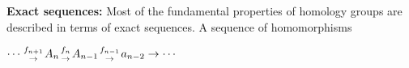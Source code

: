\def\ccy{\Cyan}		  %
\def\cpb{\ProcessBlue}	  %
\def\csb{\SkyBlue}	  %
\def\ctu{\Turquoise}	  %
\def\ctb{\TealBlue}	  %
\def\caq{\Aquamarine}	  %
\def\cbg{\BlueGreen}	  %
\def\cem{\Emerald}	  %
\def\csg{\SeaGreen}	  %
\def\cgg{\Green}	  %
\def\cfg{\ForestGreen}	  %
\def\cpg{\PineGreen}	  %
\def\clg{\LimeGreen}	  %
\def\cyg{\YellowGreen}	  %
\def\cspg{\SpringGreen}	  %
\def\cog{\OliveGreen}	  %
\def\pars{\RawSienna}	  %
\def\cse{\Sepia}		  %
\def\cbr{\Brown}		  %
\def\cta{\Tan}		  %
\def\cgr{\Gray}		  %
\def\cbl{\Black}		  %
\def\cwh{\White}		  %


\loadmsbm



\def\ctln{\centerline}
\def\u{\underbar}
\def\ssk{\smallskip}
\def\msk{\medskip}
\def\bsk{\bigskip}
\def\hsk{\hskip.1in}
\def\hhsk{\hskip.2in}
\def\dsl{\displaystyle}
\def\hskp{\hskip1.5in}

\def\lra{$\Leftrightarrow$ }
\def\ra{\rightarrow}
\def\mpto{\logmapsto}
\def\pu{\pi_1}
\def\mpu{$\pi_1$}
\def\sig{\Sigma}
\def\msig{$\Sigma$}
\def\ep{\epsilon}
\def\sset{\subseteq}
\def\del{\partial}
\def\inv{^{-1}}
\def\wtl{\widetilde}
\def\del{\partial}
\def\delp{\partial^\prime}
\def\delpp{\partial^{\prime\prime}}
\def\sgn{{\roman{sgn}}}
\def\wtih{\widetilde{H}}
\def\bbz{{\Bbb Z}}
\def\bbr{{\Bbb R}}


{\bf Exact sequences:} Most of the fundamental properties of homology groups
are described in terms of exact sequences. A sequence of homomorphisms
\ssk

\ctln{$\cdots {f_{n+1}\atop\ra} A_n {f_n\atop\ra} A_{n-1} {f_{n-1}\atop\ra} a_{n-2} 
\ra \cdots$}

\ssk

